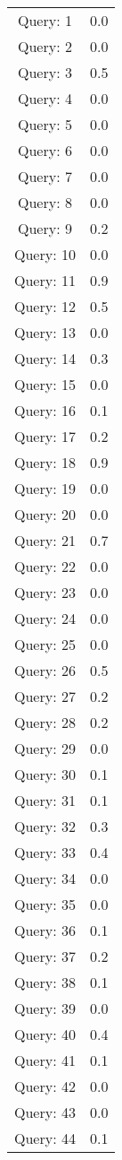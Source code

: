 
\begin{table}
\centering
\begin{tabular}{cc}
Query: 1&0.0
\\
Query: 2&0.0
\\
Query: 3&0.5
\\
Query: 4&0.0
\\
Query: 5&0.0
\\
Query: 6&0.0
\\
Query: 7&0.0
\\
Query: 8&0.0
\\
Query: 9&0.2
\\
Query: 10&0.0
\\
Query: 11&0.9
\\
Query: 12&0.5
\\
Query: 13&0.0
\\
Query: 14&0.3
\\
Query: 15&0.0
\\
Query: 16&0.1
\\
Query: 17&0.2
\\
Query: 18&0.9
\\
Query: 19&0.0
\\
Query: 20&0.0
\\
Query: 21&0.7
\\
Query: 22&0.0
\\
Query: 23&0.0
\\
Query: 24&0.0
\\
Query: 25&0.0
\\
Query: 26&0.5
\\
Query: 27&0.2
\\
Query: 28&0.2
\\
Query: 29&0.0
\\
Query: 30&0.1
\\
Query: 31&0.1
\\
Query: 32&0.3
\\
Query: 33&0.4
\\
Query: 34&0.0
\\
Query: 35&0.0
\\
Query: 36&0.1
\\
Query: 37&0.2
\\
Query: 38&0.1
\\
Query: 39&0.0
\\
Query: 40&0.4
\\
Query: 41&0.1
\\
Query: 42&0.0
\\
Query: 43&0.0
\\
Query: 44&0.1
\\

\end{tabular}
\end{table}
